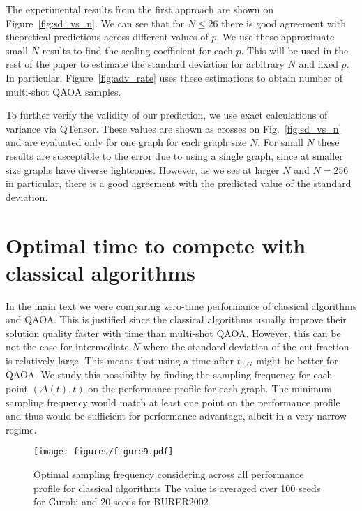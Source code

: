 \documentclass[prb,reprint,nofootinbib,longbibliography,superscriptaddress]{revtex4-1}
\begin{document}
The experimental results from the first approach are shown on Figure~\ref{fig:sd_vs_n}. 
We can see that for $N\leq26$ there is good agreement with theoretical predictions across different values of $p$.
We use these approximate small-$N$ results to find the scaling coefficient for each $p$. This will
be used in the rest of the paper to estimate the standard deviation for arbitrary $N$ and fixed $p$. In particular, Figure~\ref{fig:adv_rate} uses these estimations to obtain number of multi-shot QAOA samples.

To further verify the validity of our prediction, we use exact calculations of variance via QTensor.
These values are shown as crosses on Fig.~\ref{fig:sd_vs_n} and are evaluated only for one graph for each graph size $N$.
For small $N$ these results are susceptible to the error due to using a single graph, since at smaller size graphs have diverse lightcones. However, as we see at larger $N$ and $N=256$ in particular, there is a good agreement 
with the predicted value of the standard deviation.

\section{Optimal time to compete with classical algorithms}
\label{sec:opt_time}

In the main text we were comparing zero-time performance of classical algorithms and QAOA.
This is justified since the classical algorithms usually improve their solution quality faster with time than multi-shot QAOA. However, this can be not the case for intermediate $N$ where the standard deviation of the cut fraction is relatively large. This means that using a time after $t_{0, G}$ might be better for QAOA. 
We study this possibility by finding the sampling frequency for each point $(\Delta(t), t)$ on the performance profile for each graph. The minimum sampling frequency would match at least one point on the performance profile and thus would be sufficient for performance advantage, albeit in a very narrow regime.

\begin{figure}
    \centering
    \texttt{[image: figures/figure9.pdf]}
    
    \caption{Optimal sampling frequency considering across all performance profile for classical algorithms
    The value is averaged over 100 seeds for Gurobi and 20 seeds for BURER2002}
    \label{fig:opt_freqs}
    
\end{figure}
\end{document}
